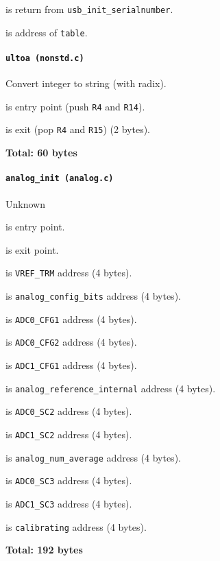  is return from \texttt{usb\_init\_serialnumber}.

 is address of \texttt{table}.

\paragraph{\texttt{ultoa (nonstd.c)}} Convert integer to string (with radix).

 is entry point (push \texttt{R4} and \texttt{R14}).

 is exit (pop \texttt{R4} and \texttt{R15}) (2 bytes).

\textbf{Total: 60 bytes}

\paragraph{\texttt{analog\_init (analog.c)}} Unknown

 is entry point.

 is exit point.

 is \texttt{VREF\_TRM} address (4 bytes).

 is \texttt{analog\_config\_bits} address (4 bytes).

 is \texttt{ADC0\_CFG1} address (4 bytes).

 is \texttt{ADC0\_CFG2} address (4 bytes).

 is \texttt{ADC1\_CFG1} address (4 bytes).

 is \texttt{analog\_reference\_internal} address
(4 bytes).

 is \texttt{ADC0\_SC2} address (4 bytes).

 is \texttt{ADC1\_SC2} address (4 bytes).

 is \texttt{analog\_num\_average} address (4 bytes).

 is \texttt{ADC0\_SC3} address (4 bytes).

 is \texttt{ADC1\_SC3} address (4 bytes).

 is \texttt{calibrating} address (4 bytes).

\textbf{Total: 192 bytes}

